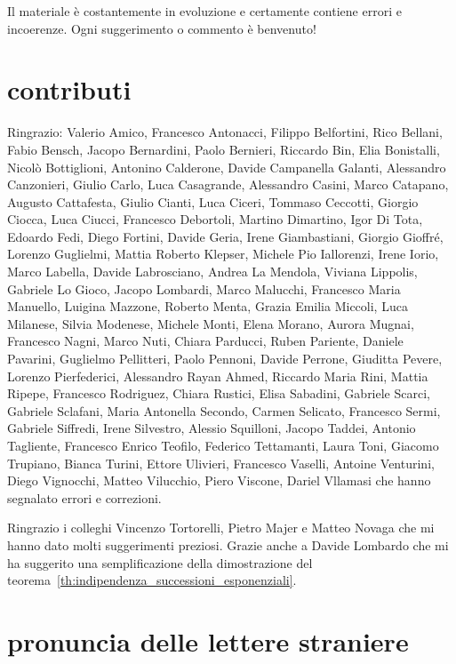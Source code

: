 Il materiale è costantemente in evoluzione %
e certamente contiene errori e incoerenze. Ogni suggerimento o commento è %
benvenuto! %


\section*{contributi}

Ringrazio:
%
Valerio Amico,
Francesco Antonacci,
Filippo Belfortini,
Rico Bellani,
Fabio Bensch,
Jacopo Bernardini,
Paolo Bernieri,
Riccardo Bin,
Elia Bonistalli,
Nicolò Bottiglioni,
Antonino Calderone,
Davide Campanella Galanti,
Alessandro Canzonieri,
Giulio Carlo,
Luca Casagrande,
Alessandro Casini,
Marco Catapano,
Augusto Cattafesta,
Giulio Cianti,
Luca Ciceri,
Tommaso Ceccotti,
Giorgio Ciocca,
Luca Ciucci,
Francesco Debortoli,
Martino Dimartino,
Igor Di Tota,
Edoardo Fedi,
Diego Fortini,
Davide Geria,
Irene Giambastiani,
Giorgio Gioffré,
Lorenzo Guglielmi,
Mattia Roberto Klepser,
Michele Pio Iallorenzi,
Irene Iorio,
Marco Labella,
Davide Labrosciano,
Andrea La Mendola,
Viviana Lippolis,
Gabriele Lo Gioco,
Jacopo Lombardi,
Marco Malucchi,
Francesco Maria Manuello,
Luigina Mazzone,
Roberto Menta,
Grazia Emilia Miccoli,
Luca Milanese,
Silvia Modenese,
Michele Monti,
Elena Morano,
Aurora Mugnai,
Francesco Nagni,
Marco Nuti,
Chiara Parducci,
Ruben Pariente,
Daniele Pavarini,
Guglielmo Pellitteri,
Paolo Pennoni,
Davide Perrone,
Giuditta Pevere,
Lorenzo Pierfederici,
Alessandro Rayan Ahmed,
Riccardo Maria Rini,
Mattia Ripepe,
Francesco Rodriguez,
Chiara Rustici,
Elisa Sabadini,
Gabriele Scarci,
Gabriele Sclafani,
Maria Antonella Secondo,
Carmen Selicato,
Francesco Sermi,
Gabriele Siffredi,
Irene Silvestro,
Alessio Squilloni,
Jacopo Taddei,
Antonio Tagliente,
Francesco Enrico Teofilo,
Federico Tettamanti,
Laura Toni,
Giacomo Trupiano,
Bianca Turini,
Ettore Ulivieri,
Francesco Vaselli,
Antoine Venturini,
Diego Vignocchi,
Matteo Vilucchio,
Piero Viscone,
Dariel Vllamasi
%
che hanno segnalato errori e correzioni.

Ringrazio i colleghi Vincenzo Tortorelli, Pietro Majer
e Matteo Novaga
che mi hanno dato molti suggerimenti preziosi.
Grazie anche a Davide Lombardo che mi ha suggerito una semplificazione 
della dimostrazione del teorema~\ref{th:indipendenza_successioni_esponenziali}.

\newpage

\section*{pronuncia delle lettere straniere}

